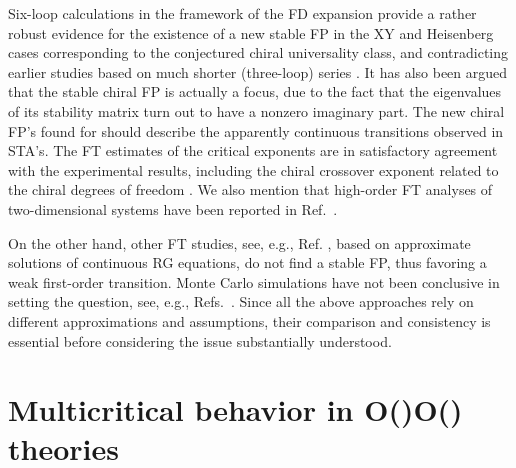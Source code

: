 \documentclass[a4paper,12pt]{article}
\begin{document}
Six-loop calculations \cite{PRV-01} in the framework of the
\coordHE{} FD expansion provide a rather robust evidence
for the existence of a new stable FP in the
XY and Heisenberg cases corresponding to the conjectured
chiral universality class, and  contradicting earlier studies
based on much shorter (three-loop) series \cite{AS-94}.
It has also been argued \cite{CPS-02} that the stable chiral FP
is actually a focus, due to the fact that the eigenvalues of 
its stability matrix turn out to have a nonzero imaginary part.
The new chiral FP's found for \coordHE{}
should describe the apparently continuous transitions observed in STA's.
The FT estimates of the critical exponents are in satisfactory agreement with
the experimental results, including the chiral crossover exponent
related to the chiral degrees of freedom \cite{PRV-02}. 
We also mention that high-order FT analyses of 
two-dimensional systems have been reported in Ref.~\cite{CP-01}.


On the other hand, other FT studies, see, e.g., Ref. \cite{TDM-00},
based on approximate solutions of continuous RG equations,
do not find a stable FP, thus favoring a weak first-order transition.
Monte Carlo simulations have not been conclusive in setting the question, 
see, e.g., Refs.~\cite{LS-98,Itakura-01,PS-02}.
Since all the above approaches rely on  
different approximations and assumptions, their comparison and consistency 
is essential before considering the issue substantially understood.





\section{Multicritical behavior in O(\coordHE{})\myHighlight{$\oplus$}\coordHE{}O(\coordHE{}) theories}
\label{multi}
\end{document}
